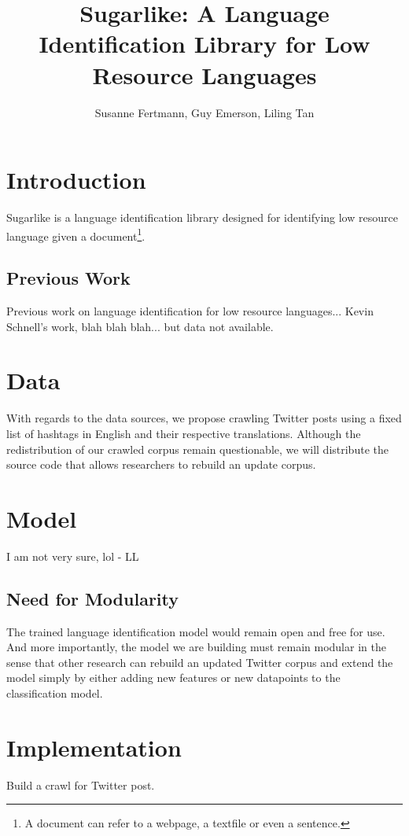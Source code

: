 \documentclass[11pt]{article}
\title{\textbf{Sugarlike: A Language Identification Library for Low Resource Languages}}
\author{Susanne Fertmann, Guy Emerson, Liling Tan}
\date{}
\begin{document}
\maketitle

\section{Introduction}

Sugarlike is a language identification library designed for identifying low resource language given a document\footnote{A document can refer to a webpage, a textfile or even a sentence.}.

\subsection{Previous Work}

Previous work on language identification for low resource languages...
Kevin Schnell's work, blah blah blah... but data not available.

\section{Data}
With regards to the data sources, we propose crawling Twitter posts using a fixed list of hashtags in English and their respective translations. Although the redistribution of our crawled corpus remain questionable, we will distribute the source code that allows researchers to rebuild an update corpus. 

\section{Model}

I am not very sure, lol - LL

\subsection{Need for Modularity}

The trained language identification model would remain open and free for use. And more importantly, the model we are building must remain modular in the sense that other research can rebuild an updated Twitter corpus and extend the model simply by either adding new features or new datapoints to the classification model.


\section{Implementation}

Build a crawl for Twitter post.
\end{document}
